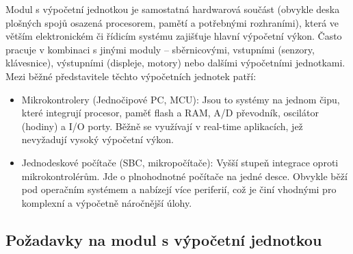 Modul s výpočetní jednotkou je samostatná hardwarová součást (obvykle deska plošných spojů osazená procesorem, pamětí a potřebnými rozhraními), která ve větším elektronickém či řídicím systému zajišťuje hlavní výpočetní výkon. Často pracuje v kombinaci s jinými moduly – sběrnicovými, vstupními (senzory, klávesnice), výstupními (displeje, motory) nebo dalšími výpočetními jednotkami. Mezi běžné představitele těchto výpočetních jednotek patří:
\begin{itemize}
    \item Mikrokontrolery (Jednočipové PC, MCU): Jsou to systémy na jednom čipu, které integrují procesor, paměť flash a RAM, A/D převodník, oscilátor (hodiny) a I/O porty. Běžně se využívají v real-time aplikacích, jež nevyžadují vysoký výpočetní výkon.
    \item Jednodeskové počítače (SBC, mikropočítače): Vyšší stupeň integrace oproti mikrokontrolérům. Jde o plnohodnotné počítače na jedné desce. Obvykle běží pod operačním systémem a nabízejí více periferií, což je činí vhodnými pro komplexní a výpočetně náročnější úlohy.
\end{itemize}



\subsection{Požadavky na modul s výpočetní jednotkou} %

